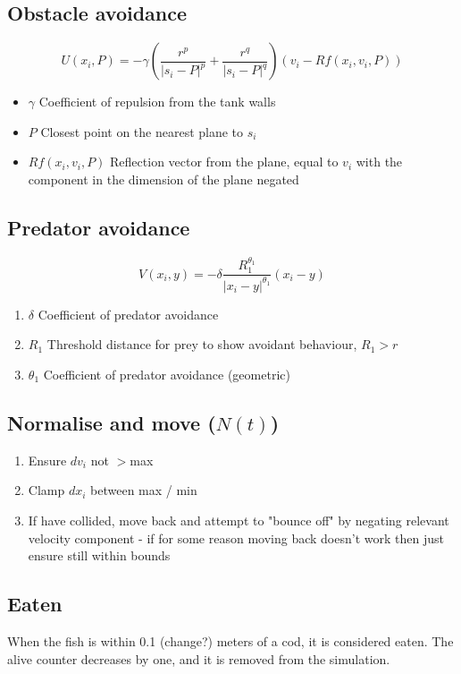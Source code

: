 \subsection{Obstacle avoidance}
\begin{equation}
    U(x_i,P)=-\gamma \left(\frac{r^p}{|s_i-P|^p}+\frac{r^q}{|s_i-P|^q}\right)(v_i - Rf(x_i, v_i, P))
\end{equation}
\begin{itemize}
    \item $\gamma$ Coefficient of repulsion from the tank walls
    \item $P$ Closest point on the nearest plane to $s_i$
    \item $Rf(x_i,v_i, P)$ Reflection vector from the plane, equal to $v_i$ with the component in the dimension of the plane negated
\end{itemize}
\subsection{Predator avoidance}
\begin{equation}
    V(x_i,y) =-\delta \frac{R_1^{\theta_1}}{|x_i-y|^{\theta_1}}(x_i-y)
\end{equation}
\begin{enumerate}
    \item $\delta$ Coefficient of predator avoidance
    \item $R_1$ Threshold distance for prey to show avoidant behaviour, $R_1>r$
    \item $\theta_1$ Coefficient of predator avoidance (geometric)
\end{enumerate}
\subsection{Normalise and move ($N(t)$)}
\begin{enumerate}
    \item Ensure $dv_i$ not $>$max
    \item Clamp $dx_i$ between max / min
    \item If have collided, move back and attempt to "bounce off" by negating relevant velocity component - if for some reason moving back doesn't work then just ensure still within bounds
\end{enumerate}
\subsection{Eaten}
When the fish is within 0.1 (change?) meters of a cod, it is considered eaten. The alive counter decreases by one, and it is removed from the simulation.
